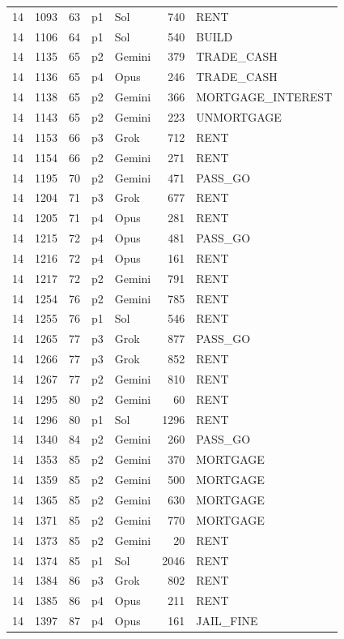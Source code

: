 \begin{longtable}{r r r l l r L{2.2in}}
14 & 1093 & 63 & p1 & Sol & 740 & RENT \\
14 & 1106 & 64 & p1 & Sol & 540 & BUILD \\
14 & 1135 & 65 & p2 & Gemini & 379 & TRADE\_CASH \\
14 & 1136 & 65 & p4 & Opus & 246 & TRADE\_CASH \\
14 & 1138 & 65 & p2 & Gemini & 366 & MORTGAGE\_INTEREST \\
14 & 1143 & 65 & p2 & Gemini & 223 & UNMORTGAGE \\
14 & 1153 & 66 & p3 & Grok & 712 & RENT \\
14 & 1154 & 66 & p2 & Gemini & 271 & RENT \\
14 & 1195 & 70 & p2 & Gemini & 471 & PASS\_GO \\
14 & 1204 & 71 & p3 & Grok & 677 & RENT \\
14 & 1205 & 71 & p4 & Opus & 281 & RENT \\
14 & 1215 & 72 & p4 & Opus & 481 & PASS\_GO \\
14 & 1216 & 72 & p4 & Opus & 161 & RENT \\
14 & 1217 & 72 & p2 & Gemini & 791 & RENT \\
14 & 1254 & 76 & p2 & Gemini & 785 & RENT \\
14 & 1255 & 76 & p1 & Sol & 546 & RENT \\
14 & 1265 & 77 & p3 & Grok & 877 & PASS\_GO \\
14 & 1266 & 77 & p3 & Grok & 852 & RENT \\
14 & 1267 & 77 & p2 & Gemini & 810 & RENT \\
14 & 1295 & 80 & p2 & Gemini & 60 & RENT \\
14 & 1296 & 80 & p1 & Sol & 1296 & RENT \\
14 & 1340 & 84 & p2 & Gemini & 260 & PASS\_GO \\
14 & 1353 & 85 & p2 & Gemini & 370 & MORTGAGE \\
14 & 1359 & 85 & p2 & Gemini & 500 & MORTGAGE \\
14 & 1365 & 85 & p2 & Gemini & 630 & MORTGAGE \\
14 & 1371 & 85 & p2 & Gemini & 770 & MORTGAGE \\
14 & 1373 & 85 & p2 & Gemini & 20 & RENT \\
14 & 1374 & 85 & p1 & Sol & 2046 & RENT \\
14 & 1384 & 86 & p3 & Grok & 802 & RENT \\
14 & 1385 & 86 & p4 & Opus & 211 & RENT \\
14 & 1397 & 87 & p4 & Opus & 161 & JAIL\_FINE \\

\end{longtable}
